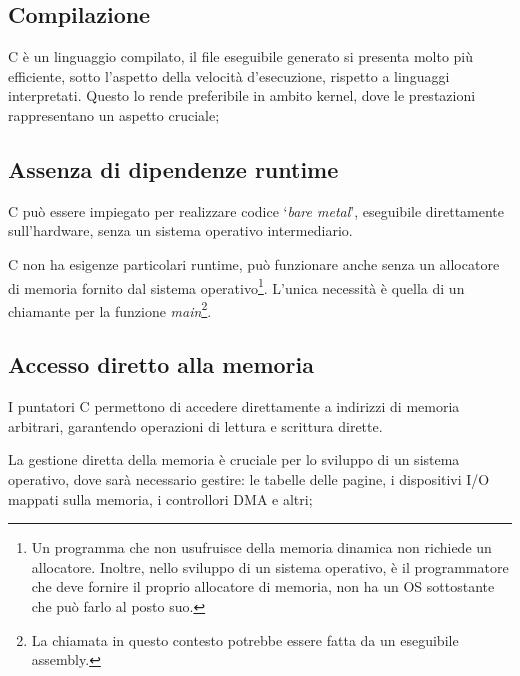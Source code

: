 \subsection*{Compilazione}
C è un linguaggio compilato, il file eseguibile generato si presenta 
molto più efficiente, sotto l'aspetto della velocità d'esecuzione, 
rispetto a linguaggi interpretati. Questo lo rende preferibile in ambito 
kernel, dove le prestazioni rappresentano un aspetto cruciale;

\subsection*{Assenza di dipendenze runtime}
C può essere impiegato per realizzare codice 
`\textit{bare metal}', eseguibile direttamente sull'hardware, 
senza un sistema operativo intermediario. 

C non ha esigenze particolari 
runtime, può funzionare anche senza un allocatore di memoria fornito dal 
sistema operativo\footnote{Un programma che non usufruisce della memoria 
dinamica non richiede un allocatore. Inoltre, nello sviluppo di un sistema 
operativo, è il programmatore che deve fornire il proprio allocatore di 
memoria, non ha un OS sottostante che può farlo al posto suo.}. L'unica 
necessità è quella di un chiamante per la funzione \textit{main}\footnote{La chiamata in questo 
contesto potrebbe essere fatta da un eseguibile assembly.}.

\subsection*{Accesso diretto alla memoria}
I puntatori C permettono di accedere direttamente a
indirizzi di memoria arbitrari, garantendo operazioni di lettura e 
scrittura dirette. 

La gestione diretta della memoria è cruciale per lo sviluppo di un 
sistema operativo, dove sarà necessario gestire: le tabelle delle pagine, 
i dispositivi I/O mappati sulla memoria, i controllori DMA e altri;

